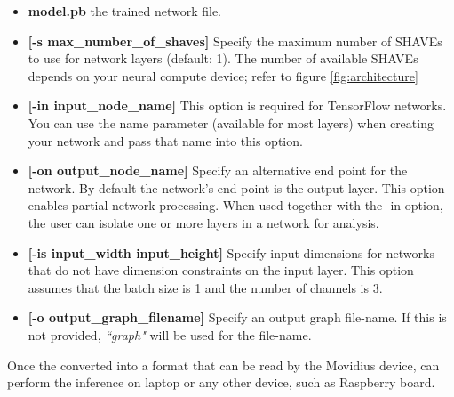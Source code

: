 \begin{itemize}
\item \textbf{model.pb} the trained network file.
\item \textbf{[-s max\_number\_of\_shaves]} Specify the maximum number of SHAVEs 
to use for network layers (default: 1).
The number of available SHAVEs depends on your neural compute device; refer to 
figure \ref{fig:architecture}
\item \textbf{[-in input\_node\_name]} This option is required for TensorFlow 
networks. 
You can use the name parameter (available for most layers) when creating your 
network and pass that name into this option.
\item \textbf{[-on output\_node\_name]} Specify an alternative end point for the 
network. 
By default the network’s end point is the output layer. 
This option enables partial network processing. When used together with the 
-in option, the user can isolate one or more layers in a network for analysis.
\item \textbf{[-is input\_width input\_height]} Specify input dimensions for 
networks that do not have dimension constraints on the input layer.
This option assumes that the batch size is 1 and the number of channels is 3.
\item \textbf{[-o output\_graph\_filename]} Specify an output graph file-name. 
If this is not provided, \emph{``graph"} will be used for the file-name.
\end{itemize}
Once the converted into a format that can be read by the Movidius device, can perform 
the inference on laptop or any other device, such as Raspberry board.
